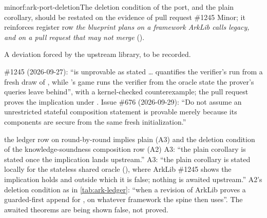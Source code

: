 \begin{finding}{minor}{f:ark-port-deletion}{The deletion condition of the port, and the plain corollary, should be restated on the evidence of pull request \#1245}
 Minor; it reinforces register row \emph{the blueprint plans on a framework
ArkLib calls legacy, and on a pull request that may not merge} ().

 A deviation forced by the upstream library, to be recorded.

 \#1245 (2026-09-27):  ``is
unprovable as stated \ldots{}  quantifies the verifier's run from a fresh draw of
, while 's game runs the verifier from the oracle state the
prover's queries leave behind'', with a kernel-checked counterexample; the pull request proves
the implication under \code{[Subsingleton σ]}. Issue \#676 (2026-09-29): ``Do not assume an
unrestricted stateful composition statement is provable merely because its components are
secure from the same fresh initialization.''

\begin{change}{the ledger row on round-by-round implies plain (A3) and the deletion condition of the knowledge-soundness composition row (A2)}
\asis A3: ``the plain corollary is stated once the implication lands upstream.''
\asproposed A3: ``the plain corollary is stated locally for the stateless shared oracle
(), where ArkLib \#1245 shows the implication holds and outside which it is
false; nothing is awaited upstream.'' A2's deletion condition as in \cref{tab:ark-ledger}:
``when a revision of ArkLib proves a guarded-first append for
, on whatever framework the spine then uses''.
\reason The awaited theorems are being shown false, not proved.
\end{change}
\end{finding}

